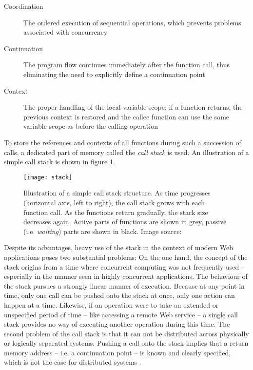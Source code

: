 \begin{description}
  \item[Coordination] The ordered execution of sequential operations, which prevents problems associated with concurrency
  \item[Continuation] The program flow continues immediately after the function call, thus eliminating the need to explicitly define a continuation point
  \item[Context] The proper handling of the local variable scope; if a function returns, the previous context is restored and the callee function can use the same variable scope as before the calling operation  
\end{description}

To store the references and contexts of all functions during such a succession of calls, a dedicated part of memory called the \textit{call stack} is used. An illustration of a simple call stack is shown in figure \ref{fig:stack}.

\begin{figure}
\centering\small
\setlength{\tabcolsep}{0mm}
  \texttt{[image: stack]}
\caption{
Illustration of a simple call stack structure. As time progresses (horizontal axis, left to right), the call stack grows with each function call. As the functions return gradually, the stack size decreases again. Active parts of functions are shown in grey, passive (i.e. \textit{waiting}) parts are shown in black. Image source: \cite{Hohpe2006}
}
\label{fig:stack}
\end{figure}

Despite its advantages, heavy use of the stack in the context of modern Web applications poses two substantial problems: On the one hand, the concept of the stack origins from a time where concurrent computing was not frequently used -- especially in the manner seen in highly concurrent applications. The behaviour of the stack pursues a strongly linear manner of execution. Because at any point in time, only one call can be pushed onto the stack at once, only one action can happen at a time. Likewise, if an operation were to take an extended or unspecified period of time -- like accessing a remote Web service -- a single call stack provides no way of executing another operation during this time. The second problem of the call stack is that it can not be distributed across physically or logically separated systems. Pushing a call onto the stack implies that a return memory address -- i.e. a continuation point -- is known and clearly specified, which is not the case for distributed systems \cite{Hohpe2006}. 

